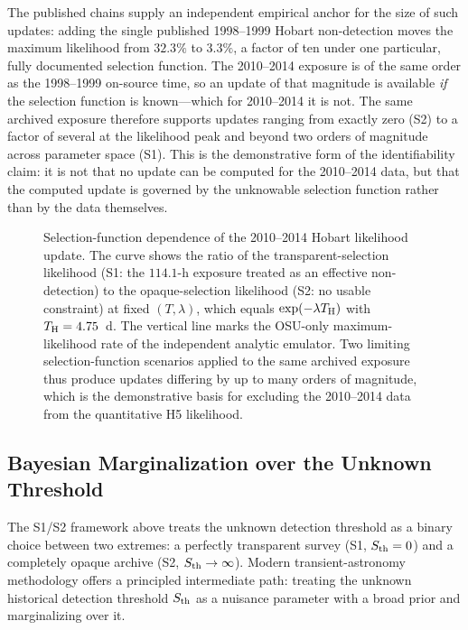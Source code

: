 \documentclass[twocolumn]{aastex701}
\begin{document}
The published chains supply an independent empirical anchor for the size of such updates: adding the single published 1998--1999 Hobart non-detection moves the maximum likelihood from $32.3\%$ to $3.3\%$, a factor of ten under one particular, fully documented selection function. The 2010--2014 exposure is of the same order as the 1998--1999 on-source time, so an update of that magnitude is available {\em if} the selection function is known---which for 2010--2014 it is not. The same archived exposure therefore supports updates ranging from exactly zero (S2) to a factor of several at the likelihood peak and beyond two orders of magnitude across parameter space (S1). This is the demonstrative form of the identifiability claim: it is not that no update can be computed for the 2010--2014 data, but that the computed update is governed by the unknowable selection function rather than by the data themselves.

\begin{figure}[ht!]
\caption{Selection-function dependence of the 2010--2014 Hobart likelihood update. The curve shows the ratio of the transparent-selection likelihood (S1: the $114.1$-h exposure treated as an effective non-detection) to the opaque-selection likelihood (S2: no usable constraint) at fixed $(T,\lambda)$, which equals $\exp(-\lambda T_{\rm H})$ with $T_{\rm H}=4.75$~d. The vertical line marks the OSU-only maximum-likelihood rate of the independent analytic emulator. Two limiting selection-function scenarios applied to the same archived exposure thus produce updates differing by up to many orders of magnitude, which is the demonstrative basis for excluding the 2010--2014 data from the quantitative H5 likelihood.}
\label{fig:hobart_selection}
\end{figure}

\subsection{Bayesian Marginalization over the Unknown Threshold}
\label{sec:h5_bayes_marg}

The S1/S2 framework above treats the unknown detection threshold as a binary choice between two extremes: a perfectly transparent survey (S1, $S_{\rm th}=0$) and a completely opaque archive (S2, $S_{\rm th}\rightarrow\infty$). Modern transient-astronomy methodology offers a principled intermediate path: treating the unknown historical detection threshold $S_{\rm th}$ as a nuisance parameter with a broad prior and marginalizing over it.
\end{document}
